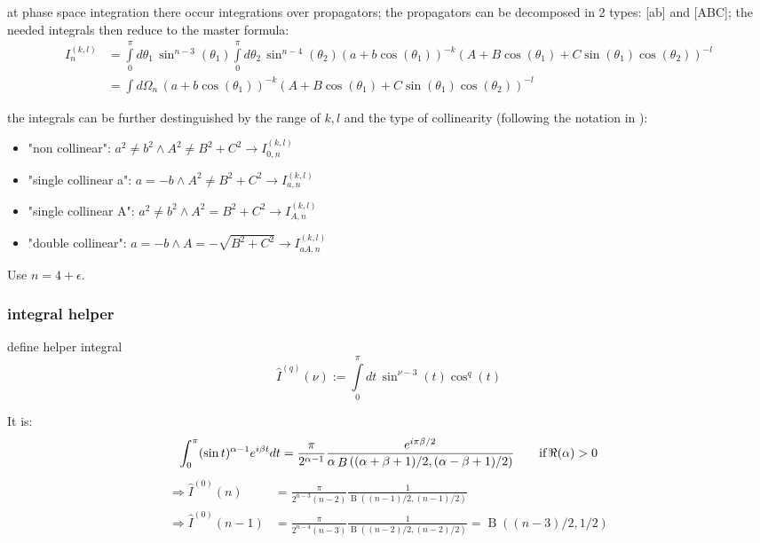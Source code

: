 at phase space integration there occur integrations over propagators\cite{Bojak:2000eu,PhysRevD.40.54,van_neerven_dimensional_1986}; the propagators can be decomposed in 2 types: [ab] and [ABC]; the needed integrals then reduce to the master formula:
\begin{align}
I_n^{(k,l)} &=\int\limits_0^\pi\!d\theta_1\,\sin^{n-3}(\theta_1)\int\limits_0^\pi\!d\theta_2\,\sin^{n-4}(\theta_2)(a+b\cos(\theta_1))^{-k}(A+B\cos(\theta_1)+C\sin(\theta_1)\cos(\theta_2))^{-l}\\
&=\int\!d\Omega_n\,(a+b\cos(\theta_1))^{-k}(A+B\cos(\theta_1)+C\sin(\theta_1)\cos(\theta_2))^{-l}
\end{align}

the integrals can be further destinguished by the range of $k,l$ and the type of collinearity (following the notation in \cite{Bojak:2000eu}):
\begin{itemize}
\item "non collinear": $a^2\neq b^2 \land A^2 \neq B^2 + C^2 \rightarrow I_{0,n}^{(k,l)}$
\item "single collinear a": $a=-b \land A^2 \neq B^2 + C^2 \rightarrow I_{a,n}^{(k,l)}$
\item "single collinear A": $a^2\neq b^2 \land A^2 = B^2 + C^2 \rightarrow I_{A,n}^{(k,l)}$
\item "double collinear": $a=-b \land A = -\sqrt{B^2 + C^2} \rightarrow I_{aA,n}^{(k,l)}$
\end{itemize}

Use $n=4+\epsilon$.

\subsubsection{integral helper}
define helper integral
\begin{equation}
\hat I^{(q)}(\nu) := \int\limits_0^\pi\!dt\,\sin^{\nu-3}(t)\cos^{q}(t)
\end{equation}

It is\cite[eq. 5.12.6]{NIST:DLMF}:
\begin{equation}
\int_{0}^{\pi}(\mathop{\sin\/}\nolimits t)^{\alpha-1}e^{i\beta t}dt=\frac{\pi}{2^{\alpha-1}} \frac{e^{i\pi \beta/2}}{\alpha\mathop{B}\left((\alpha+\beta+1)/2,(\alpha-\beta+1)/2\right)} \qquad\text{if}\,\Re(\alpha) > 0
\end{equation}
\begin{align}
\Rightarrow \hat I^{(0)}(n) &= \frac{\pi}{2^{n-3}(n-2)}\frac 1 {\mathop{B}((n-1)/2,(n-1)/2)}\\
\Rightarrow \hat I^{(0)}(n-1) &= \frac{\pi}{2^{n-4}(n-3)}\frac 1 {\mathop{B}((n-2)/2,(n-2)/2)}=\mathop{B}((n-3)/2,1/2)
\end{align}

